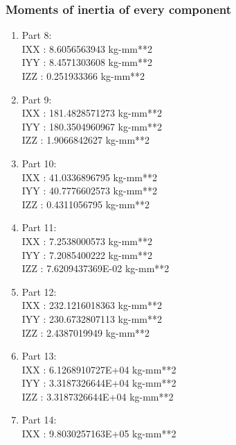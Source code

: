             \subsubsection{Moments of inertia of every component}
                \begin{enumerate}
                    \item Part 8: \\ IXX             : 8.6056563943 kg-mm**2 \\
                    IYY             : 8.4571303608 kg-mm**2 \\
                    IZZ             : 0.251933366 kg-mm**2
                    \item Part 9: \\ IXX             : 181.4828571273 kg-mm**2 \\
                    IYY             : 180.3504960967 kg-mm**2 \\
                    IZZ             : 1.9066842627 kg-mm**2
                    \item Part 10: \\ IXX             : 41.0336896795 kg-mm**2 \\
                    IYY             : 40.7776602573 kg-mm**2 \\
                    IZZ             : 0.4311056795 kg-mm**2
                    \item Part 11: \\ IXX             : 7.2538000573 kg-mm**2 \\
                    IYY             : 7.2085400222 kg-mm**2 \\
                    IZZ             : 7.6209437369E-02 kg-mm**2
                    \item Part 12: \\ IXX             : 232.1216018363 kg-mm**2 \\
                    IYY             : 230.6732807113 kg-mm**2 \\
                    IZZ             : 2.4387019949 kg-mm**2
                    \item Part 13: \\ IXX             : 6.1268910727E+04 kg-mm**2 \\
                    IYY             : 3.3187326644E+04 kg-mm**2 \\
                    IZZ             : 3.3187326644E+04 kg-mm**2
                    \item Part 14: \\ IXX             : 9.8030257163E+05 kg-mm**2 \\

\end{enumerate}
